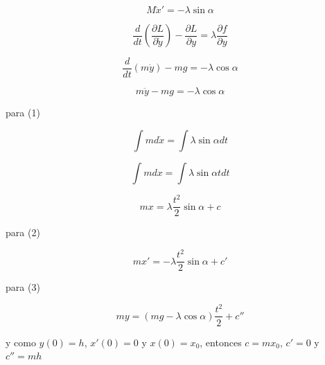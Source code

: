 \documentclass[12pt,a4paper]{article}
\begin{document}
\begin{enumerate}
        \begin{equation}
            M\ddot{x}' = - \lambda \sin{\alpha} 
        \end{equation}
        
        \begin{equation*}
            \frac{d}{dt}\left(\frac{\partial L}{\partial \dot{y}}\right) - \frac{\partial L}{\partial y} = \lambda \frac{\partial f}{\partial y}
        \end{equation*}
        
        \begin{equation*}
            \frac{d}{dt}\left(m\dot{y}\right) - mg =  - \lambda  \cos{\alpha}
        \end{equation*}
        
        \begin{equation}
            m\ddot{y} - mg =  - \lambda  \cos{\alpha}
        \end{equation}
        
        para (1)
        
        \begin{equation*}
            \int m d\dot{x} = \int \lambda \sin{\alpha} dt
        \end{equation*}
        
        \begin{equation*}
            \int m dx = \int\lambda \sin{\alpha} t dt
        \end{equation*}
        
        \begin{equation*}
            m x = \lambda \frac{t^2}{2} \sin{\alpha} + c
        \end{equation*}
        
        para (2)
        
        \begin{equation*}
            m x' = -\lambda \frac{t^2}{2} \sin{\alpha} + c'
        \end{equation*}
        
        para (3)
        
        \begin{equation*}
            m y = (mg-\lambda \cos{\alpha})\frac{t^2}{2} + c''
        \end{equation*}
        
        y como $y(0) = h$, $x'(0) = 0$ y $x(0) = x_0$, entonces $c = mx_0$, $c' = 0$ y $c'' = mh$
        
        
        

\end{enumerate}
\end{document}
